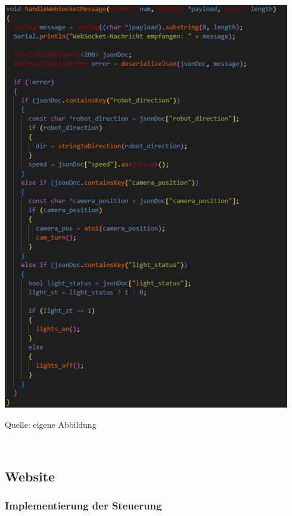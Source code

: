 \documentclass[ngerman,12pt,a4paper]{article}
\begin{document}
	\begin{center}
		\begin{minipage}[t]{0.85\textwidth}
			\includegraphics{Pictures/handlewebsocketmessage}
			\label{fig:handlewebsocketmessage}
			\vspace{-10pt}
			\begin{center}
				\par\small Quelle: eigene Abbildung 
			\end{center}
		\end{minipage} \\[0.75cm]
	\end{center} \newpage

	\subsection{Website}

		\subsubsection{Implementierung der Steuerung}
			
\end{document}
